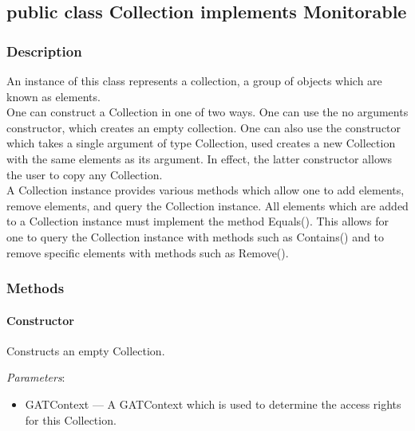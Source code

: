 \documentclass[$Date: 2003/06/26 19:29:31 $]{glabarticle}
\begin{document}

\newpage

\subsection{public class Collection implements Monitorable}


\subsubsection{Description}

An instance of this class represents a collection, a group of objects
which are known as elements. \\

One can construct a Collection in one of two ways. One can use the no
arguments constructor, which creates an empty collection. One can also
use the constructor which takes a single argument of type Collection,
used creates a new Collection with the same elements as its
argument. In effect, the latter constructor allows the user to copy
any Collection. \\

A Collection instance provides various methods which allow one to add
elements, remove elements, and query the Collection instance. All
elements which are added to a Collection instance must implement the
method Equals(). This allows for one to query the Collection instance
with methods such as Contains() and to remove specific elements with
methods such as Remove().


\subsubsection{Methods}

\paragraph{Constructor}

Constructs an empty Collection.

\textit{Parameters}:
\begin{itemize}
\item[] GATContext --- A GATContext which is used to determine the access rights for this Collection.
\end{itemize}
\end{document}
